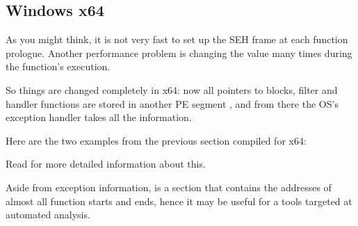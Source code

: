 \subsection{Windows x64}

\label{SEH_win64}

As you might think, it is not very fast to set up the SEH frame at each function prologue.
Another performance problem is changing the 
 value many times during the function's execution.

So things are changed completely in x64: now all pointers to  blocks, filter and handler functions are stored
in another PE segment , 
and from there the \ac{OS}'s exception handler takes all the information.

Here are the two examples from the previous section compiled for x64:





Read \IgorSkochinsky for more detailed information about this.

Aside from exception information, 
is a section that contains the addresses of almost all function starts and ends,
hence it may be useful for a tools targeted at automated analysis.


